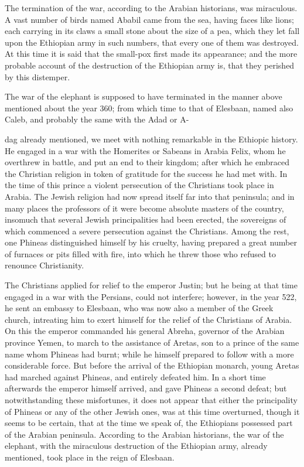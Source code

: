\documentclass{article}
\begin{document}
The termination of the war, according to the Arabian historians, was miraculous. A vast number of birds named Ababil came from the sea, having faces like lions; each carrying in its claws a small stone about the size of a pea, which they let fall upon the Ethiopian army in such numbers, that every one of them was destroyed. At this time it is said that the small-pox first made its appearance; and the more probable account of the destruction of the Ethiopian army is, that they perished by this distemper.

The war of the elephant is supposed to have terminated in the manner above mentioned about the year 360; from which time to that of Elesbaan, named also Caleb, and probably the same with the Adad or A-

dag already mentioned, we meet with nothing remarkable in the Ethiopic history. He engaged in a war with the Homerites or Sabeans in Arabia Felix, whom he overthrew in battle, and put an end to their kingdom; after which he embraced the Christian religion in token of gratitude for the success he had met with. In the time of this prince a violent persecution of the Christians took place in Arabia. The Jewish religion had now spread itself far into that peninsula; and in many places the professors of it were become absolute masters of the country, insomuch that several Jewish principalities had been erected, the sovereigns of which commenced a severe persecution against the Christians. Among the rest, one Phineas distinguished himself by his cruelty, having prepared a great number of furnaces or pits filled with fire, into which he threw those who refused to renounce Christianity.

The Christians applied for relief to the emperor Justin; but he being at that time engaged in a war with the Persians, could not interfere; however, in the year 522, he sent an embassy to Elesbaan, who was now also a member of the Greek church, intreating him to exert himself for the relief of the Christians of Arabia. On this the emperor commanded his general Abreha, governor of the Arabian province Yemen, to march to the assistance of Aretas, son to a prince of the same name whom Phineas had burnt; while he himself prepared to follow with a more considerable force. But before the arrival of the Ethiopian monarch, young Aretas had marched against Phineas, and entirely defeated him. In a short time afterwards the emperor himself arrived, and gave Phineas a second defeat; but notwithstanding these misfortunes, it does not appear that either the principality of Phineas or any of the other Jewish ones, was at this time overturned, though it seems to be certain, that at the time we speak of, the Ethiopians possessed part of the Arabian peninsula. According to the Arabian historians, the war of the elephant, with the miraculous destruction of the Ethiopian army, already mentioned, took place in the reign of Elesbaan.
\end{document}
